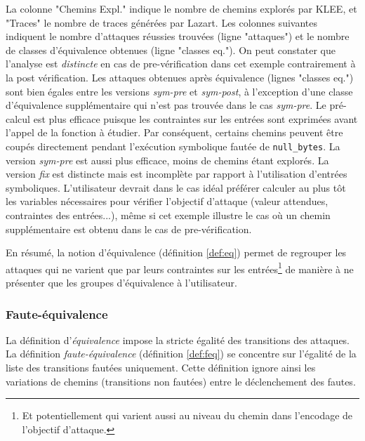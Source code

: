                 La colonne "Chemins Expl." indique le nombre de chemins explorés par KLEE, et "Traces" le nombre de traces générées par Lazart.
                Les colonnes suivantes indiquent le nombre d'attaques réussies trouvées (ligne "attaques") et le nombre de classes d'équivalence obtenues (ligne "classes eq.").
                On peut constater que l'analyse est \textit{distincte} en cas de pre-vérification dans cet exemple contrairement à la post vérification. 
                Les attaques obtenues après équivalence (lignes "classes eq.") sont bien égales entre les versions \textit{sym-pre} et \textit{sym-post}, à l'exception d'une classe d'équivalence supplémentaire qui n'est pas trouvée dans le cas \textit{sym-pre}. 
                Le pré-calcul est plus efficace puisque les contraintes sur les entrées sont exprimées avant l'appel de la fonction à étudier. Par conséquent, certains chemins peuvent être coupés directement pendant l'exécution symbolique fautée de \texttt{null\_bytes}.
                La version \textit{sym-pre} est aussi plus efficace, moins de chemins étant explorés.
                La version \textit{fix} est distincte mais est incomplète par rapport à l'utilisation d'entrées symboliques.
                L'utilisateur devrait dans le cas idéal préférer calculer au plus tôt les variables nécessaires pour vérifier l'objectif d'attaque (valeur attendues, contraintes des entrées...), même si cet exemple illustre le cas où un chemin supplémentaire est obtenu dans le cas de pre-vérification.
                
                En résumé, la notion d'équivalence (définition \ref{def:eq}) permet de regrouper les attaques qui ne varient que par leurs contraintes sur les entrées\footnote{Et potentiellement qui varient aussi au niveau du chemin dans l'encodage de l'objectif d'attaque.} de manière à ne présenter que les groupes d'équivalence à l'utilisateur.

            \subsubsection{Faute-équivalence}
            \label{sec:feq}
            
                La définition d'\textit{équivalence} impose la stricte égalité des transitions des attaques.
                La définition \textit{faute-équivalence} (définition \ref{def:feq}) se concentre sur l'égalité de la liste des transitions fautées uniquement.
                Cette définition ignore ainsi les variations de chemins (transitions non fautées) entre le déclenchement des fautes. 
                
